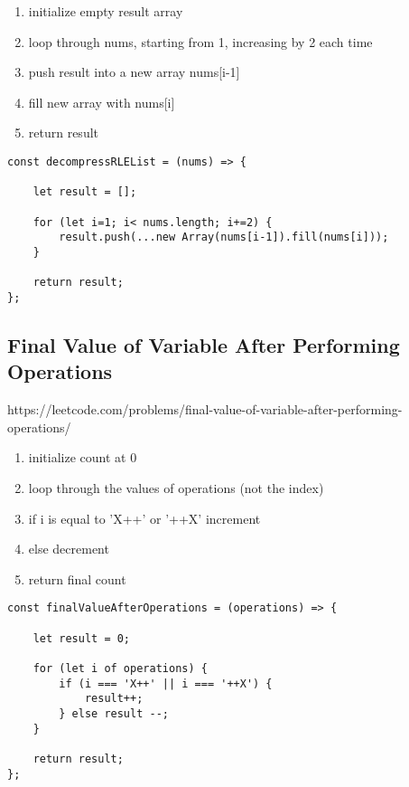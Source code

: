\documentclass[10pt]{article}
\begin{document}
\begin{enumerate}
	\item initialize empty result array
	\item loop through nums, starting from 1, increasing by 2 each time
	\item push result into a new array nums[i-1]
	\item fill new array with nums[i]
	\item return result 
\end{enumerate}

\begin{lstlisting}[title=Solution decompressRLEList, captionpos=t]
const decompressRLEList = (nums) => {

    let result = [];
    
    for (let i=1; i< nums.length; i+=2) {
        result.push(...new Array(nums[i-1]).fill(nums[i]));
    }
    
    return result;
};
\end{lstlisting}
\medskip %



\pagebreak
\medskip %
\subsection{Final Value of Variable After Performing Operations}
https://leetcode.com/problems/final-value-of-variable-after-performing-operations/

\begin{enumerate}
	\item initialize count at 0
	\item loop through the values of operations (not the index)
	\item if i is equal to 'X++' or '++X' increment
	\item else decrement 
	\item return final count
\end{enumerate}

\begin{lstlisting}[title=Solution finalValueAfterOperations, captionpos=t]
const finalValueAfterOperations = (operations) => {

    let result = 0;

    for (let i of operations) {
        if (i === 'X++' || i === '++X') {
            result++;
        } else result --;
    }
    
    return result;
};
\end{lstlisting}
\medskip %
\end{document}
